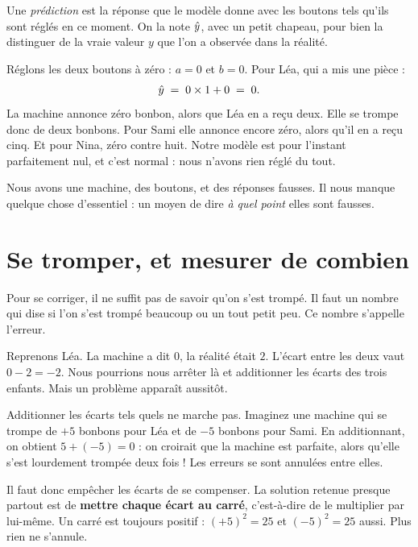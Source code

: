 \begin{definition}[La prédiction][prediction]
Une \emph{prédiction} est la réponse que le modèle donne avec les boutons
tels qu'ils sont réglés en ce moment. On la note $\hat{y}$, avec un petit
chapeau, pour bien la distinguer de la vraie valeur $y$ que l'on a observée
dans la réalité.
\end{definition}

\begin{exemple}
Réglons les deux boutons à zéro : $a = 0$ et $b = 0$. Pour Léa, qui a mis
une pièce :
\[
  \hat{y} \;=\; 0 \times 1 + 0 \;=\; 0 .
\]
La machine annonce zéro bonbon, alors que Léa en a reçu deux. Elle se trompe
donc de deux bonbons. Pour Sami elle annonce encore zéro, alors qu'il en a
reçu cinq. Et pour Nina, zéro contre huit. Notre modèle est pour l'instant
parfaitement nul, et c'est normal : nous n'avons rien réglé du tout.
\end{exemple}

Nous avons une machine, des boutons, et des réponses fausses. Il nous
manque quelque chose d'essentiel : un moyen de dire \emph{à quel point}
elles sont fausses.

\section{Se tromper, et mesurer de combien}

\begin{enclair}
Pour se corriger, il ne suffit pas de savoir qu'on s'est trompé. Il faut un
nombre qui dise si l'on s'est trompé beaucoup ou un tout petit peu. Ce
nombre s'appelle l'erreur.
\end{enclair}

Reprenons Léa. La machine a dit $0$, la réalité était $2$. L'écart entre les
deux vaut $0 - 2 = -2$. Nous pourrions nous arrêter là et additionner les
écarts des trois enfants. Mais un problème apparaît aussitôt.

\begin{piege}
Additionner les écarts tels quels ne marche pas. Imaginez une machine qui se
trompe de $+5$ bonbons pour Léa et de $-5$ bonbons pour Sami. En
additionnant, on obtient $5 + (-5) = 0$ : on croirait que la machine est
parfaite, alors qu'elle s'est lourdement trompée deux fois ! Les erreurs se
sont annulées entre elles.
\end{piege}

Il faut donc empêcher les écarts de se compenser. La solution retenue
presque partout est de \textbf{mettre chaque écart au carré}, c'est-à-dire de
le multiplier par lui-même. Un carré est toujours positif : $(+5)^2 = 25$ et
$(-5)^2 = 25$ aussi. Plus rien ne s'annule.

